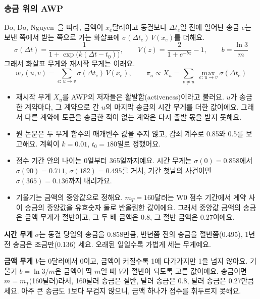 \subsubsection{송금 위의 AWP}

Do, Do, Nguyen~\cite{do2023awp}을 따라, 금액이 $x_e$달러이고 동결보다 $\Delta t_e$일 전에 일어난 송금 $e$는 보낸 쪽에서 받는 쪽으로 가는 화살표에 $\sigma(\Delta t_e)\,V(x_e)$를 더해요.
\begin{equation}
\label{eq:weights}
\sigma(\Delta t)=\frac{1}{1+\exp\bigl(k(\Delta t-t_0)\bigr)},
\qquad
V(z)=\frac{2}{1+e^{-bz}}-1,
\qquad
b=\frac{\ln 3}{m}
\end{equation}
그래서 화살표 무게와 재시작 무게는 이래요.
\begin{equation}
\label{eq:awp-weight}
w_T(u,v)=\sum_{e:\,u\to v}\sigma(\Delta t_e)\,V(x_e),
\qquad
\pi_u\propto X_u=\sum_{v\neq u}\ \max_{e:\,u\to v}\sigma(\Delta t_e)
\end{equation}
\begin{itemize}
\item 재시작 무게 $X_u$를 AWP의 저자들은 활발함(activeness)이라고 불러요. $u$가 송금한 계약마다, 그 계약으로 간 $u$의 마지막 송금의 시간 무게를 더한 값이에요. 그래서 다른 계약에 토큰을 송금한 적이 없는 계약은 다시 출발 몫을 받지 못해요.
\item 원 논문은 두 무게 함수의 매개변수 값을 주지 않고, 감쇠 계수로 0.85와 0.5를 보고해요. 계획이 $k=0.01$, $t_0=180$일로 정했어요.
\item 점수 기간 안의 나이는 0일부터 365일까지예요. 시간 무게는 $\sigma(0)=0.858$에서 $\sigma(90)=0.711$, $\sigma(182)=0.495$를 거쳐, 기간 첫날의 사건이면 $\sigma(365)=0.136$까지 내려가요.
\item 기울기는 금액의 중앙값으로 정해요. $m_T=160$달러는 W0 점수 기간에서 계약 사이 송금의 중앙값을 유효숫자 둘로 반올림한 값이에요. 그래서 중앙값 금액의 송금은 금액 무게가 절반이고, 그 두 배 금액은 0.8, 그 절반 금액은 0.27이에요.
\end{itemize}

\begin{puri}
\textbf{시간 무게} $\sigma$는 동결 당일의 송금을 0.858만큼, 반년쯤 전의 송금을 절반쯤(0.495), 1년 전 송금은 조금만(0.136) 세요. 오래된 일일수록 가볍게 세는 무게예요.

\textbf{금액 무게} $V$는 0달러에서 0이고, 금액이 커질수록 1에 다가가지만 1을 넘지 않아요. 기울기 $b=\ln 3/m$은 금액이 딱 $m$일 때 $V$가 절반이 되도록 고른 값이에요. 송금이면 $m=m_T$(160달러)라서, 160달러 송금은 절반, 달러 송금은 0.8, 달러 송금은 0.27만큼 세요. 아주 큰 송금도 1보다 무겁지 않으니, 금액 하나가 점수를 휘두르지 못해요.
\end{puri}

